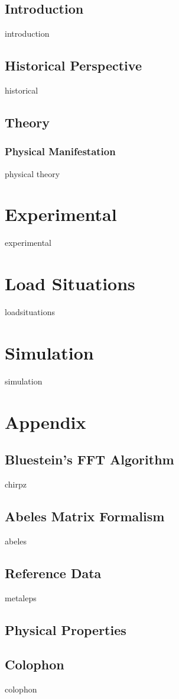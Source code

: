 \documentclass[a4paper,titlepage,onecolumn]{report}
\begin{document}
\section{Introduction}
{introduction}
\section{Historical Perspective}
{historical}
\section{Theory}
\subsection{Physical Manifestation}
{physical}
{theory}
\chapter{Experimental} \label{ch:qcmexperimental}
{experimental}
\chapter{Load Situations} \label{ch:qcmloadsituations}
{loadsituations}
\chapter{Simulation} \label{ch:qcmsimulation}
{simulation}

\appendix
\chapter{Appendix}
\section{Bluestein's FFT Algorithm}
{chirpz}
\section{Abeles Matrix Formalism} \label{ch:abeles}
{abeles}
\section{Reference Data} \label{ch:reference}
{metaleps}
\section{Physical Properties}
\label{ref:physicalproperties}
\section{Colophon}
{colophon}



\end{document}
